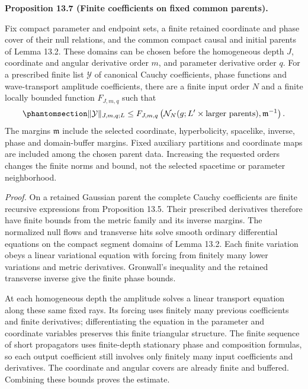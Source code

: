 \documentclass[
  english,
  11pt,
  reqno]{amsart}
\makeatletter
\newcommand{\pandocstatementheading}[1]{%
  \par\addpenalty{\@beginparpenalty}%
  \addvspace{.5\baselineskip plus .2\baselineskip minus .2\baselineskip}%
  {\normalfont\bfseries #1\par}%
  \nobreak\@afterindenttrue\@afterheading
}
\newcommand{\paperblockheading}[2][.45\baselineskip]{%
  \par\Needspace{6\baselineskip}%
  \addvspace{\baselineskip}%
  \noindent{\normalfont\bfseries #2}\par\nobreak
  \vskip#1\relax\nobreak
}
\makeatother
\begin{document}
\paperblockheading[0pt]{Estimates at finite orders.}

\pandocstatementheading{\protect{}\label{prop:family-wave-finite-estimates}Proposition 13.7 (Finite coefficients on fixed common parents).}

Fix compact parameter and endpoint sets, a finite retained coordinate
and phase cover of their null relations, and the common compact causal
and initial parents of Lemma 13.2. These domains can be chosen before
the homogeneous depth \(J\), coordinate and angular derivative order
\(m\), and parameter derivative order \(q\). For a prescribed finite
list \(\mathcal Y\) of canonical Cauchy coefficients, phase functions
and wave-transport amplitude coefficients, there are a finite input
order \(N\) and a finite locally bounded function \(F_{J,m,q}\) such
that
\begin{equation}\protect\phantomsection\label{eq:family-global-wave-finite-estimates}{
\|\mathcal Y\|_{J,m,q;L}
\le F_{J,m,q}\left(
\mathcal N_N(g;L'\times\text{larger parents}),
\mathfrak m^{-1}\right).
}\end{equation} The margins \(\mathfrak m\) include the selected
coordinate, hyperbolicity, spacelike, inverse, phase and domain-buffer
margins. Fixed auxiliary partitions and coordinate maps are included
among the chosen parent data. Increasing the requested orders changes
the finite norms and bound, not the selected spacetime or parameter
neighborhood.

\emph{Proof.} On a retained Gaussian parent the complete Cauchy
coefficients are finite recursive expressions from Proposition 13.5.
Their prescribed derivatives therefore have finite bounds from the
metric family and its inverse margins. The normalized null flows and
transverse hits solve smooth ordinary differential equations on the
compact segment domains of Lemma 13.2. Each finite variation obeys a
linear variational equation with forcing from finitely many lower
variations and metric derivatives. Gronwall's inequality and the
retained transverse inverse give the finite phase bounds.

At each homogeneous depth the amplitude solves a linear transport
equation along these same fixed rays. Its forcing uses finitely many
previous coefficients and finite derivatives; differentiating the
equation in the parameter and coordinate variables preserves this finite
triangular structure. The finite sequence of short propagators uses
finite-depth stationary phase and composition formulas, so each output
coefficient still involves only finitely many input coefficients and
derivatives. The coordinate and angular covers are already finite and
buffered. Combining these bounds proves the estimate.
\end{document}
